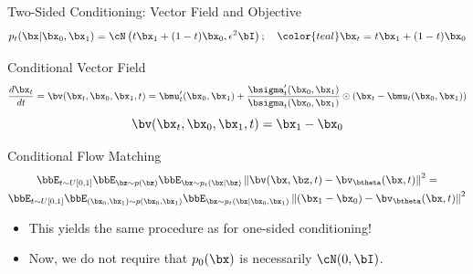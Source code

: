 \documentclass{beamer}
\begin{document}
\begin{frame}{Two-Sided Conditioning: Vector Field and Objective}
	\vspace{-0.3cm}
	\[
		p_t(\bx | \bx_0, \bx_1) = \cN\left(t \bx_1 + (1 - t) \bx_0, \epsilon^2 \bI\right); \quad {\color{teal}\bx_t = t \bx_1 + (1 - t) \bx_0}
	\]
	\vspace{-0.5cm}
	\begin{block}{Conditional Vector Field}
		\vspace{-0.5cm}
		\[
			 \frac{d\bx_t}{dt} = \bv(\bx_t, \bx_0, \bx_1, t) =  \bmu_t'(\bx_0, \bx_1) + \frac{\bsigma_t'(\bx_0, \bx_1)}{\bsigma_t(\bx_0, \bx_1)} \odot (\bx_t - \bmu_t(\bx_0, \bx_1))
		\]
		\eqpause
		\vspace{-0.5cm}
		\[
			\bv(\bx_t, \bx_0, \bx_1, t) = \bx_1 - \bx_0
		\]
		\vspace{-0.7cm}
	\end{block}
	\eqpause
	\begin{block}{Conditional Flow Matching}
		\vspace{-0.7cm}
		\begin{multline*}
			\bbE_{t \sim U[0, 1]} \bbE_{\bz \sim p(\bz)} \bbE_{\bx \sim p_t(\bx | \bz)}\left\| \bv(\bx, \bz, t) - \bv_{\btheta}(\bx, t) \right\|^2 = \\
		 \bbE_{t \sim U[0, 1]} \bbE_{(\bx_0, \bx_1) \sim p(\bx_0, \bx_1)} \bbE_{\bx \sim p_t(\bx | \bx_0, \bx_1)} \left\| (\bx_1 - \bx_0) - \bv_{\btheta}(\bx, t) \right\|^2
		\end{multline*}
	\end{block}
	\eqpause
	\vspace{-0.3cm}
	\begin{itemize}
		\item This yields the same procedure as for one-sided conditioning!
		\item Now, we do not require that $p_0(\bx)$ is necessarily $\cN(0, \bI)$.
	\end{itemize} 
\end{frame}
\end{document}
